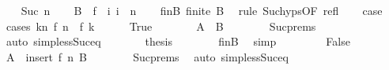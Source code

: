 \begin{isabellebody}
\isanewline
\ \ \isamarkupfalse%
\ {\isacharparenleft}{\kern0pt}Suc\ n{\isacharparenright}{\kern0pt}\isanewline
\ \ \isamarkupfalse%
\ {\isacharquery}{\kern0pt}B\ {\isacharequal}{\kern0pt}\ {\isachardoublequoteopen}f\ {\isacharbackquote}{\kern0pt}\ {\isacharbraceleft}{\kern0pt}i{\isachardot}{\kern0pt}\ i\ {\isacharless}{\kern0pt}\ n{\isacharbraceright}{\kern0pt}{\isachardoublequoteclose}\isanewline
\ \ \isamarkupfalse%
\ finB{\isacharcolon}{\kern0pt}\ {\isachardoublequoteopen}finite\ {\isacharquery}{\kern0pt}B{\isachardoublequoteclose}\ \isamarkupfalse%
\ {\isacharparenleft}{\kern0pt}rule\ Suc{\isachardot}{\kern0pt}hyps{\isacharbrackleft}{\kern0pt}OF\ refl{\isacharbrackright}{\kern0pt}{\isacharparenright}{\kern0pt}\isanewline
\ \ \isamarkupfalse%
\ {\isacharquery}{\kern0pt}case\isanewline
\ \ \isamarkupfalse%
\ {\isacharparenleft}{\kern0pt}cases\ {\isachardoublequoteopen}{\isasymexists}k{\isacharless}{\kern0pt}n{\isachardot}{\kern0pt}\ f\ n\ {\isacharequal}{\kern0pt}\ f\ k{\isachardoublequoteclose}{\isacharparenright}{\kern0pt}\isanewline
\ \ \ \ \isamarkupfalse%
\ True\isanewline
\ \ \ \ \isamarkupfalse%
\ \isamarkupfalse%
\ {\isachardoublequoteopen}A\ {\isacharequal}{\kern0pt}\ {\isacharquery}{\kern0pt}B{\isachardoublequoteclose}\isanewline
\ \ \ \ \ \ \isamarkupfalse%
\ Suc{\isachardot}{\kern0pt}prems\ \isamarkupfalse%
\ {\isacharparenleft}{\kern0pt}auto\ simp{\isacharcolon}{\kern0pt}less{\isacharunderscore}{\kern0pt}Suc{\isacharunderscore}{\kern0pt}eq{\isacharparenright}{\kern0pt}\isanewline
\ \ \ \ \isamarkupfalse%
\ \isamarkupfalse%
\ {\isacharquery}{\kern0pt}thesis\isanewline
\ \ \ \ \ \ \isamarkupfalse%
\ finB\ \isamarkupfalse%
\ simp\isanewline
\ \ \isamarkupfalse%
\isanewline
\ \ \ \ \isamarkupfalse%
\ False\isanewline
\ \ \ \ \isamarkupfalse%
\ \isamarkupfalse%
\ {\isachardoublequoteopen}A\ {\isacharequal}{\kern0pt}\ insert\ {\isacharparenleft}{\kern0pt}f\ n{\isacharparenright}{\kern0pt}\ {\isacharquery}{\kern0pt}B{\isachardoublequoteclose}\isanewline
\ \ \ \ \ \ \isamarkupfalse%
\ Suc{\isachardot}{\kern0pt}prems\ \isamarkupfalse%
\ {\isacharparenleft}{\kern0pt}auto\ simp{\isacharcolon}{\kern0pt}less{\isacharunderscore}{\kern0pt}Suc{\isacharunderscore}{\kern0pt}eq{\isacharparenright}{\kern0pt}\isanewline

\end{isabellebody}
